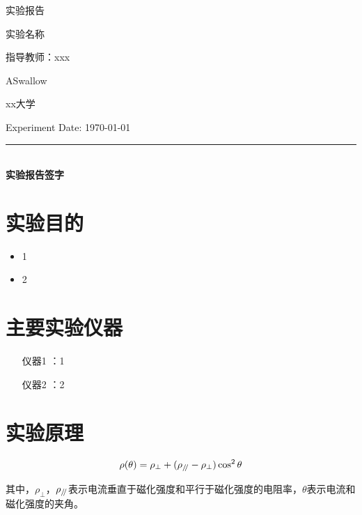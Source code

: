 \documentclass[12pt,a4paper]{article}
\renewcommand{\parallel}{\mathrel{/ \mskip-4mu /}}
\begin{document}
	
	\begin{titlepage}
		\centering
		{\Huge 实验报告}\par\vspace{1.5cm}
		{\Large 实验名称}\par\vspace{1cm}
		{\large 指导教师：xxx}\par\vspace{0.5cm}
		{\large ASwallow}\par\vspace{0.5cm}
		{\large xx大学}\par\vspace{5cm}
		
		\large Experiment Date: \hspace{4cm} \today\par\vspace{0.5cm} %
		\rule{10cm}{0.4pt} \\
		\textbf{实验报告签字} 
	\end{titlepage}
	
	\tableofcontents
	\newpage
	
	\section{实验目的}
	\begin{itemize}
		\item 1
		\item 2
	\end{itemize}
	
	\section{主要实验仪器}
	\begin{itemize}
		\item [仪器1]：1
		\item [仪器2]：2
	\end{itemize}
	
	\section{实验原理}
	
	
	\begin{equation}
		\rho(\theta)=\rho_\perp+(\rho_{\parallel}-\rho_\perp )\cos^2\theta
	\end{equation}
	
	其中，\(\rho_\perp\)，\(\rho_{\parallel}\)表示电流垂直于磁化强度和平行于磁化强度的电阻率，\(\theta\)表示电流和磁化强度的夹角。
	
\end{document}
